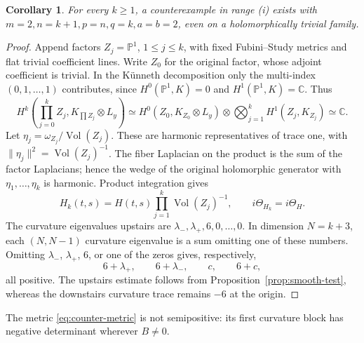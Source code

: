 \documentclass[11pt,reqno]{amsart}
\numberwithin{equation}{section}
\newtheorem{corollary}[theorem]{Corollary}
\theoremstyle{definition}
\theoremstyle{remark}
\begin{document}
\begin{corollary}\label{cor:counter-higher-q}
For every $k\ge1$, a counterexample in range (i) exists with
$m=2,n=k+1,p=n,q=k,a=b=2$, even on a holomorphically trivial family.
\end{corollary}
\begin{proof}
Append factors $Z_j=\mathbb P^1$, $1\le j\le k$, with fixed
Fubini--Study metrics and flat trivial coefficient lines.  Write
$Z_0$ for the original factor, whose adjoint coefficient is trivial.
In the K\"unneth decomposition only the multi-index $(0,1,\ldots,1)$
contributes, since $H^0(\mathbb P^1,K)=0$ and
$H^1(\mathbb P^1,K)=\mathbb C$.  Thus
\[
 H^k\!\left(\prod_{j=0}^kZ_j,K_{\prod Z_j}\otimes L_y\right)
 \simeq H^0(Z_0,K_{Z_0}\otimes L_y)
       \otimes\bigotimes_{j=1}^kH^1(Z_j,K_{Z_j})\simeq\mathbb C.
\]
Let $\eta_j=\omega_{Z_j}/\operatorname{Vol}(Z_j)$.  These are
harmonic representatives of trace one, with
$\|\eta_j\|^2=\operatorname{Vol}(Z_j)^{-1}$.
The fiber Laplacian on the product is the sum of the factor
Laplacians; hence the wedge of the original holomorphic generator
with $\eta_1,\ldots,\eta_k$ is harmonic.  Product integration gives
\[
 H_k(t,s)=H(t,s)\prod_{j=1}^k\operatorname{Vol}(Z_j)^{-1},\qquad
 i\Theta_{H_k}=i\Theta_H.
\]
The curvature eigenvalues upstairs are
$\lambda_-,\lambda_+,6,0,\ldots,0$.  In dimension $N=k+3$, each
$(N,N-1)$ curvature eigenvalue is a sum omitting one of these
numbers.  Omitting $\lambda_-$, $\lambda_+$, $6$, or one of the
zeros gives, respectively,
\[
 6+\lambda_+,\qquad 6+\lambda_-,\qquad c,\qquad6+c,
\]
all positive.  The upstairs estimate follows from
Proposition~\ref{prop:smooth-test}, whereas the downstairs curvature
trace remains $-6$ at the origin.
\end{proof}

The metric \eqref{eq:counter-metric} is not semipositive: its first
curvature block has negative determinant wherever $B\ne0$.
\end{document}
